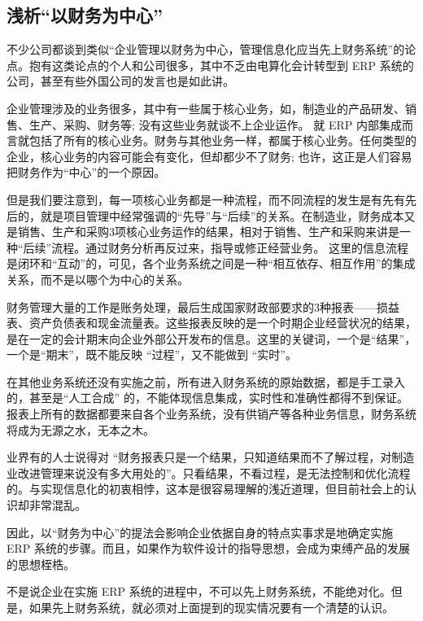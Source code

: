 \subsection {浅析“以财务为中心”}

    不少公司都谈到类似“企业管理以财务为中心，管理信息化应当先上财务系统”的论点。抱有这类论点的个人和公司很多，其中不乏由电算化会计转型到 ERP 系统的公司，甚至有些外国公司的发言也是如此讲。

    企业管理涉及的业务很多，其中有一些属于核心业务，如，制造业的产品研发、销售、生产、采购、财务等; 没有这些业务就谈不上企业运作。 就 ERP 内部集成而言就包括了所有的核心业务。财务与其他业务一样，都属于核心业务。任何类型的企业，核心业务的内容可能会有变化，但却都少不了财务; 也许，这正是人们容易把财务作为“中心”的一个原因。

    但是我们要注意到，每一项核心业务都是一种流程，而不同流程的发生是有先有先后的，就是项目管理中经常强调的“先导”与“后续”的关系。在制造业，财务成本又是销售、生产和采购3项核心业务运作的结果，相对于销售、生产和采购来讲是一种“后续”流程。通过财务分析再反过来，指导或修正经营业务。 这里的信息流程是闭环和“互动”的，可见，各个业务系统之间是一种“相互依存、相互作用”的集成关系，而不是以哪个为中心的关系。

    财务管理大量的工作是账务处理，最后生成国家财政部要求的3种报表——损益表、资产负债表和现金流量表。这些报表反映的是一个时期企业经营状况的结果，是在一定的会计期末向企业外部公开发布的信息。这里的关键词，一个是“结果”，一个是“期末”，既不能反映 “过程”，又不能做到 “实时”。

    在其他业务系统还没有实施之前，所有进入财务系统的原始数据，都是手工录入的，甚至是“人工合成” 的，不能体现信息集成，实时性和准确性都得不到保证。报表上所有的数据都要来自各个业务系统，没有供销产等各种业务信息，财务系统将成为无源之水，无本之木。

    业界有的人士说得对 “财务报表只是一个结果，只知道结果而不了解过程，对制造业改进管理来说没有多大用处的”。只看结果，不看过程，是无法控制和优化流程的。与实现信息化的初衷相悖，这本是很容易理解的浅近道理，但目前社会上的认识却非常混乱。

    因此，以“财务为中心”的提法会影响企业依据自身的特点实事求是地确定实施 ERP 系统的步骤。而且，如果作为软件设计的指导思想，会成为束缚产品的发展的思想桎梏。

    不是说企业在实施 ERP 系统的进程中，不可以先上财务系统，不能绝对化。但是，如果先上财务系统，就必须对上面提到的现实情况要有一个清楚的认识。
